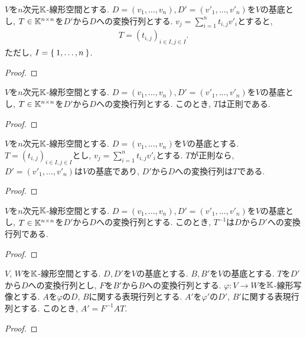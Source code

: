 \begin{prop}
  $V$を$n$次元$\mathbb{K}$-線形空間とする.
  $D=(v_1,\ldots, v_n),D'=(v'_1,\ldots, v'_n)$を$V$の基底とし,
  $T\in\mathbb{K}^{n\times n}$を$D'$から$D$への変換行列とする.
  $v_j=\sum_{i=1}^n t_{i,j}v'_i$とすると,
  \begin{align*}
    T=(t_{i,j})_{i\in I, j\in I}.
  \end{align*}
  ただし, $I=\Set{1,\ldots, n} $.
\end{prop}
\begin{proof}\end{proof}

\begin{prop}
  $V$を$n$次元$\mathbb{K}$-線形空間とする.
  $D=(v_1,\ldots, v_n),D'=(v'_1,\ldots, v'_n)$を$V$の基底とし,
  $T\in\mathbb{K}^{n\times n}$を$D'$から$D$への変換行列とする.
  このとき, $T$は正則である.
\end{prop}
\begin{proof}\end{proof}

\begin{prop}
  $V$を$n$次元$\mathbb{K}$-線形空間とする.
  $D=(v_1,\ldots, v_n)$を$V$の基底とする.
  $T=(t_{i,j})_{i\in I, j\in I}$とし,
  $v_j=\sum_{i=1}^n t_{i,j}v'_i$とする.
  $T$が正則なら,
  $D'=(v'_1,\ldots, v'_n)$は$V$の基底であり,
  $D'$から$D$への変換行列は$T$である.
\end{prop}
\begin{proof}\end{proof}


\begin{prop}
  $V$を$n$次元$\mathbb{K}$-線形空間とする.
  $D=(v_1,\ldots, v_n),D'=(v'_1,\ldots, v'_n)$を$V$の基底とし,
  $T\in\mathbb{K}^{n\times n}$を$D'$から$D$への変換行列とする.
  このとき, $T^{-1}$は$D$から$D'$への変換行列である.
\end{prop}
\begin{proof}\end{proof}



\begin{prop}
  $V$, $W$を$\mathbb{K}$-線形空間とする.
  $D, D'$を$V$の基底とする.
  $B, B'$を$V$の基底とする.
  $T$を$D'$から$D$への変換行列とし,
  $F$を$B'$から$B$への変換行列とする.
  $\varphi\colon V\to W$を$\mathbb{K}$-線形写像とする.
  $A$を$\varphi$の$D$, $B$に関する表現行列とする.
  $A'$を$\varphi'$の$D'$, $B'$に関する表現行列とする.
  このとき,
  $A'=F^{-1}AT$.
\end{prop}
\begin{proof}\end{proof}

